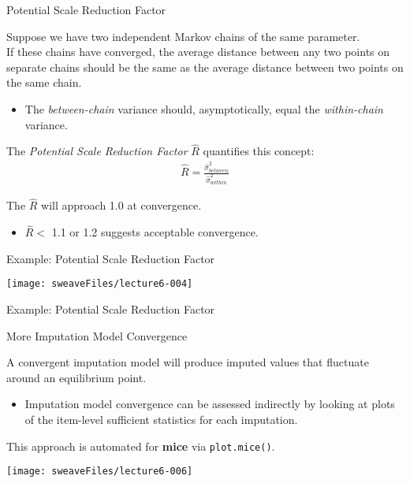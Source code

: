 \documentclass{beamer}
\begin{document}
\begin{frame}{Potential Scale Reduction Factor}
  
  Suppose we have two independent Markov chains of the same
  parameter.\\
  \vspace{12pt} 
  If these chains have converged, the average distance
  between any two points on separate chains should be the same as the
  average distance between two points on the same chain.
  \vspace{6pt}
  \begin{itemize}
    \item The \emph{between-chain} variance should, asymptotically,
      equal the \emph{within-chain} variance.
  \end{itemize}
  \vspace{6pt}
  The \emph{Potential Scale Reduction Factor} $\widehat{R}$ quantifies this concept:
  \begin{align*}
    \widehat{R} = \frac{\hat{\sigma}^2_{between}}{\hat{\sigma}^2_{within}}
  \end{align*}
  
  The $\widehat{R}$ will approach 1.0 at convergence.
  \vspace{3pt}
  \begin{itemize}
    \item $\widehat{R} < $ 1.1 or 1.2 suggests acceptable convergence.
  \end{itemize}
  
\end{frame}


\begin{frame}{Example: Potential Scale Reduction Factor}
   

\texttt{[image: sweaveFiles/lecture6-004]}

\end{frame}


\begin{frame}{Example: Potential Scale Reduction Factor}
  


\end{frame}


\begin{frame}[allowframebreaks]{More Imputation Model Convergence}
  
  A convergent imputation model will produce imputed values that
  fluctuate around an equilibrium point. 
  \vspace{6pt}
  \begin{itemize}
  \item Imputation model convergence can be assessed indirectly by
    looking at plots of the item-level sufficient statistics for each
    imputation.
  \end{itemize}
  \vspace{12pt}
  This approach is automated for \textbf{mice} via \texttt{plot.mice()}.
  \vspace{12pt}

\texttt{[image: sweaveFiles/lecture6-006]}

\end{frame}
\end{document}
